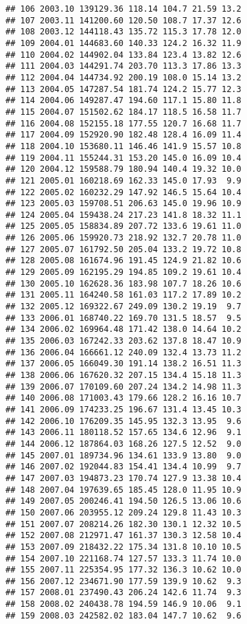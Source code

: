 \documentclass[]{article}
\begin{document}
\begin{verbatim}
## 106 2003.10 139129.36 118.14 104.7 21.59 13.2
## 107 2003.11 141200.60 120.50 108.7 17.37 12.6
## 108 2003.12 144118.43 135.72 115.3 17.78 12.0
## 109 2004.01 144683.60 140.33 124.2 16.32 11.9
## 110 2004.02 144902.04 133.84 123.4 13.82 12.6
## 111 2004.03 144291.74 203.70 113.3 17.86 13.3
## 112 2004.04 144734.92 200.19 108.0 15.14 13.2
## 113 2004.05 147287.54 181.74 124.2 15.77 12.3
## 114 2004.06 149287.47 194.60 117.1 15.80 11.8
## 115 2004.07 151502.62 184.17 118.5 16.58 11.7
## 116 2004.08 152155.18 177.55 120.7 16.68 11.7
## 117 2004.09 152920.90 182.48 128.4 16.09 11.4
## 118 2004.10 153680.11 146.46 141.9 15.57 10.8
## 119 2004.11 155244.31 153.20 145.0 16.09 10.4
## 120 2004.12 159588.79 180.94 140.4 19.32 10.0
## 121 2005.01 160218.69 162.33 145.0 17.93  9.9
## 122 2005.02 160232.29 147.92 146.5 15.64 10.4
## 123 2005.03 159708.51 206.63 145.0 19.96 10.9
## 124 2005.04 159438.24 217.23 141.8 18.32 11.1
## 125 2005.05 158834.89 207.72 133.6 19.61 11.0
## 126 2005.06 159920.73 218.92 132.7 20.78 11.0
## 127 2005.07 161792.50 205.04 133.2 19.72 10.8
## 128 2005.08 161674.96 191.45 124.9 21.82 10.6
## 129 2005.09 162195.29 194.85 109.2 19.61 10.4
## 130 2005.10 162628.36 183.98 107.7 18.26 10.6
## 131 2005.11 164240.58 161.03 117.2 17.89 10.2
## 132 2005.12 169322.67 249.09 130.2 19.19  9.7
## 133 2006.01 168740.22 169.70 131.5 18.57  9.5
## 134 2006.02 169964.48 171.42 138.0 14.64 10.2
## 135 2006.03 167242.33 203.62 137.8 18.47 10.9
## 136 2006.04 166661.12 240.09 132.4 13.73 11.2
## 137 2006.05 166049.30 191.14 138.2 16.51 11.3
## 138 2006.06 167620.32 207.15 134.4 15.18 11.3
## 139 2006.07 170109.60 207.24 134.2 14.98 11.3
## 140 2006.08 171003.43 179.66 128.2 16.16 10.7
## 141 2006.09 174233.25 196.67 131.4 13.45 10.3
## 142 2006.10 176209.35 145.95 132.3 13.95  9.6
## 143 2006.11 180118.52 157.65 134.6 12.96  9.1
## 144 2006.12 187864.03 168.26 127.5 12.52  9.0
## 145 2007.01 189734.96 134.61 133.9 13.80  9.0
## 146 2007.02 192044.83 154.41 134.4 10.99  9.7
## 147 2007.03 194873.23 170.74 127.9 13.38 10.4
## 148 2007.04 197639.65 185.45 128.0 11.95 10.9
## 149 2007.05 200246.41 194.50 126.5 13.06 10.6
## 150 2007.06 203955.12 209.24 129.8 11.43 10.3
## 151 2007.07 208214.26 182.30 130.1 12.32 10.5
## 152 2007.08 212971.47 161.37 130.3 12.58 10.4
## 153 2007.09 218432.22 175.34 131.8 10.10 10.5
## 154 2007.10 221168.74 127.57 133.3 11.74 10.0
## 155 2007.11 225354.95 177.32 136.3 10.62 10.0
## 156 2007.12 234671.90 177.59 139.9 10.62  9.3
## 157 2008.01 237490.43 206.24 142.6 11.74  9.3
## 158 2008.02 240438.78 194.59 146.9 10.06  9.1
## 159 2008.03 242582.02 183.04 147.7 10.62  9.6

\end{verbatim}
\end{document}
